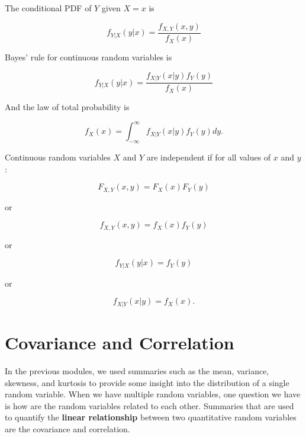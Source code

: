 \documentclass[
]{book}
\begin{document}
The conditional PDF of \(Y\) given \(X=x\) is

\begin{equation} 
f_{Y|X}(y|x) = \frac{f_{X,Y}(x,y)}{f_X(x)}
\label{eq:5-condPDF}
\end{equation}

Bayes' rule for continuous random variables is

\begin{equation} 
f_{Y|X}(y|x) = \frac{f_{X|Y}(x|y) f_Y(y)}{f_X(x)}
\label{eq:5-condPDFbayes}
\end{equation}

And the law of total probability is

\begin{equation} 
f_X(x) = \int_{-\infty}^\infty f_{X|Y}(x|y) f_Y(y) dy.
\label{eq:5-condPDFtotal}
\end{equation}

Continuous random variables \(X\) and \(Y\) are independent if for all values of \(x\) and \(y\):

\begin{equation} 
F_{X,Y} (x,y) = F_X(x) F_Y(y)
\label{eq:5-indcont1}
\end{equation}

or

\begin{equation} 
f_{X,Y} (x,y) = f_X(x) f_Y(y)
\label{eq:5-indcont2}
\end{equation}

or

\begin{equation} 
f_{Y|X} (y|x) = f_Y(y)
\label{eq:5-indcont3}
\end{equation}

or

\begin{equation} 
f_{X|Y} (x|y) = f_X(x).
\label{eq:5-indcont4}
\end{equation}

\hypertarget{covcorr}{%
\section{Covariance and Correlation}\label{covcorr}}

In the previous modules, we used summaries such as the mean, variance, skewness, and kurtosis to provide some insight into the distribution of a single random variable. When we have multiple random variables, one question we have is how are the random variables related to each other. Summaries that are used to quantify the \textbf{linear relationship} between two quantitative random variables are the covariance and correlation.
\end{document}

